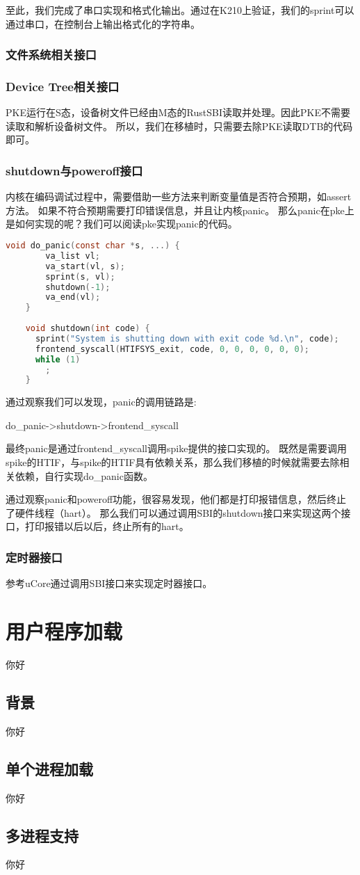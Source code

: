 至此，我们完成了串口实现和格式化输出。通过在K210上验证，我们的sprint可以通过串口，在控制台上输出格式化的字符串。

\subsubsection{文件系统相关接口}

\subsubsection{Device Tree相关接口}

PKE运行在S态，设备树文件已经由M态的RustSBI读取并处理。因此PKE不需要读取和解析设备树文件。
所以，我们在移植时，只需要去除PKE读取DTB的代码即可。

\subsubsection{shutdown与poweroff接口}

内核在编码调试过程中，需要借助一些方法来判断变量值是否符合预期，如assert方法。
如果不符合预期需要打印错误信息，并且让内核panic。
那么panic在pke上是如何实现的呢？我们可以阅读pke实现panic的代码。

\begin{lstlisting}[language=C, caption={panic实现代码}, label={lst:panic} ]
    void do_panic(const char *s, ...) {
        va_list vl;
        va_start(vl, s);
        sprint(s, vl);
        shutdown(-1);
        va_end(vl);
    }
    
    void shutdown(int code) {
      sprint("System is shutting down with exit code %d.\n", code);
      frontend_syscall(HTIFSYS_exit, code, 0, 0, 0, 0, 0, 0);
      while (1)
        ;
    }    
\end{lstlisting}

通过观察我们可以发现，panic的调用链路是:

do\_panic->shutdown->frontend\_syscall

最终panic是通过frontend\_syscall调用spike提供的接口实现的。
既然是需要调用spike的HTIF，与spike的HTIF具有依赖关系，那么我们移植的时候就需要去除相关依赖，自行实现do\_panic函数。

通过观察panic和poweroff功能，很容易发现，他们都是打印报错信息，然后终止了硬件线程（hart）。
那么我们可以通过调用SBI的shutdown接口来实现这两个接口，打印报错以后以后，终止所有的hart。

\subsubsection{定时器接口}

参考uCore通过调用SBI接口来实现定时器接口。

\section{用户程序加载}
你好
\subsection{背景}
你好

\subsection{单个进程加载}
你好

\subsection{多进程支持}
你好